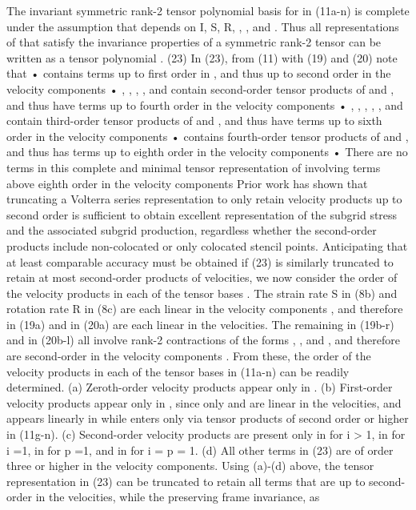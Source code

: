 The invariant symmetric rank-2 tensor polynomial basis   for   in 
(11a-n) is complete under the assumption that   depends on I, S, R,  ,  , and  .  Thus all representations of   that satisfy the invariance properties of a symmetric rank-2 tensor can be written as a tensor polynomial
 .                                                       (23)
In (23), from (11) with (19) and (20) note that
•	  contains terms up to first order in  , and thus up to second order in the velocity components  
•	 ,  ,  ,  , and   contain second-order tensor products of   and  , and thus have terms up to fourth order in the velocity components  
•	 ,  ,  ,  ,  , and   contain third-order tensor products of   and  , and thus have terms up to sixth order in the velocity components  
•	  contains fourth-order tensor products of   and  , and thus has terms up to eighth order in the velocity components  
•	There are no terms in this complete and minimal tensor representation of   involving terms above eighth order in the velocity components  
Prior work has shown that truncating a Volterra series representation to only retain velocity products up to second order is sufficient to obtain excellent representation of the subgrid stress and the associated subgrid production, regardless whether the second-order products include non-colocated or only colocated stencil points.  Anticipating that at least comparable accuracy must be obtained if (23) is similarly truncated to retain at most second-order products of velocities, we now consider the order of the velocity products in each of the tensor bases  .
The strain rate S in (8b) and rotation rate R in (8c) are each linear in the velocity components  , and therefore   in (19a) and   in (20a) are each linear in the velocities.  The remaining   in (19b-r) and   in (20b-l) all involve rank-2 contractions of the forms  ,  , and  , and therefore are second-order in the velocity components  .  From these, the order of the velocity products in each of the tensor bases   in (11a-n) can be readily determined.  
(a)	Zeroth-order velocity products appear only in  .  
(b)	First-order velocity products appear only in  , since only   and   are linear in the velocities, and   appears linearly in   while   enters only via tensor products of second order or higher in (11g-n).  
(c)	Second-order velocity products are present only in   for i > 1, in   for i =1, in   for p =1, and in   for i = p = 1.
(d)	All other terms in (23) are of order three or higher in the velocity components.
Using (a)-(d) above, the tensor representation in (23) can be truncated to retain all terms that are up to second-order in the velocities, while the preserving frame invariance, as
